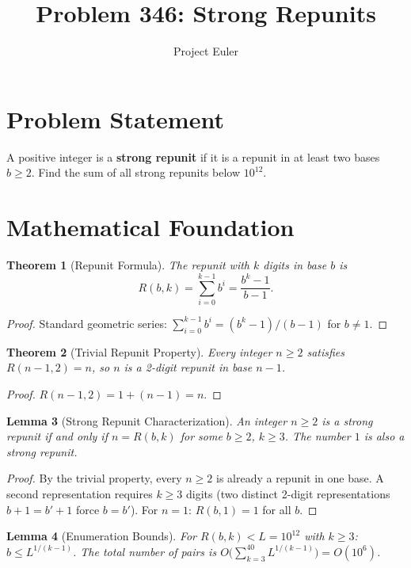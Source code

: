\documentclass[a4paper,12pt]{article}
\title{Problem 346: Strong Repunits}
\author{Project Euler}
\date{}
\newtheorem{theorem}{Theorem}
\newtheorem{lemma}[theorem]{Lemma}
\begin{document}
\maketitle

\section{Problem Statement}
A positive integer is a \textbf{strong repunit} if it is a repunit in at least two bases $b \ge 2$. Find the sum of all strong repunits below $10^{12}$.

\section{Mathematical Foundation}

\begin{theorem}[Repunit Formula]
The repunit with $k$ digits in base $b$ is
\[
R(b,k) = \sum_{i=0}^{k-1} b^i = \frac{b^k - 1}{b - 1}.
\]
\end{theorem}

\begin{proof}
Standard geometric series: $\sum_{i=0}^{k-1} b^i = (b^k - 1)/(b-1)$ for $b \ne 1$.
\end{proof}

\begin{theorem}[Trivial Repunit Property]
Every integer $n \ge 2$ satisfies $R(n-1, 2) = n$, so $n$ is a 2-digit repunit in base $n-1$.
\end{theorem}

\begin{proof}
$R(n-1,2) = 1 + (n-1) = n$.
\end{proof}

\begin{lemma}[Strong Repunit Characterization]
An integer $n \ge 2$ is a strong repunit if and only if $n = R(b,k)$ for some $b \ge 2$, $k \ge 3$. The number $1$ is also a strong repunit.
\end{lemma}

\begin{proof}
By the trivial property, every $n \ge 2$ is already a repunit in one base. A second representation requires $k \ge 3$ digits (two distinct 2-digit representations $b+1 = b'+1$ force $b = b'$). For $n = 1$: $R(b,1) = 1$ for all $b$.
\end{proof}

\begin{lemma}[Enumeration Bounds]
For $R(b,k) < L = 10^{12}$ with $k \ge 3$: $b \le L^{1/(k-1)}$. The total number of pairs is $O\!\bigl(\sum_{k=3}^{40} L^{1/(k-1)}\bigr) = O(10^6)$.
\end{lemma}
\end{document}
